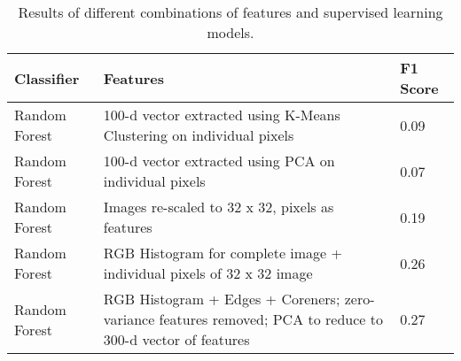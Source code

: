 \documentclass[10pt,a4paper]{article}
\begin{document}
\begin{table}[h]
\small
\setlength\extrarowheight{4pt}
\caption{Results of different combinations of features and supervised learning models.}
    \begin{tabular}{p{4cm}p{8cm}p{1.4cm}}
    \hline
    \textbf{Classifier}                                                                                                                                                                             & \textbf{Features}                                                                                                                                                                                            & \textbf{F1 Score} \\
    \hline
    Random Forest                                                                                                                                                                          & 100-d vector extracted using K-Means Clustering on individual pixels                                                                                                                                & 0.09     \\
    \hline
    Random Forest                                                                                                                                                                          & 100-d vector extracted using PCA on individual pixels                                                                                                                                               & 0.07     \\
    \hline
    Random Forest                                                                                                                                                                          & Images re-scaled to 32 x 32, pixels as features                                                                                                                                                     & 0.19     \\
    \hline
    Random Forest                                                                                                                                                                          & RGB Histogram for complete image + individual pixels of 32 x 32 image                                                                                                                               & 0.26     \\
    \hline
    Random Forest & RGB Histogram + Edges + Coreners; zero-variance features removed; PCA to reduce to 300-d vector of features & 0.27     \\

\end{tabular}
\end{table}
\end{document}
